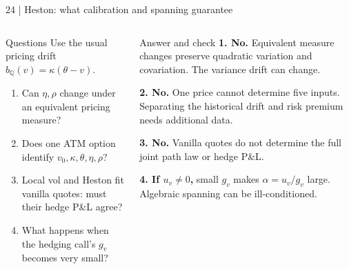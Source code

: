 \documentclass[handout,10pt,t,aspectratio=169]{beamer}
\newcommand{\Q}{\mathbb Q}
\newenvironment{questions}{\begin{block}{Questions}}{\end{block}}
\newenvironment{answers}{\begin{exampleblock}{Answer and check}}{\end{exampleblock}}
\newcommand{\compact}{\small%
 \setlength{\abovedisplayskip}{3pt}%
 \setlength{\belowdisplayskip}{3pt}%
 \setlength{\abovedisplayshortskip}{2pt}%
 \setlength{\belowdisplayshortskip}{2pt}%
 \setlength{\parskip}{2pt}}
\begin{document}
\begin{frame}{24 | Heston: what calibration and spanning guarantee}
\compact
\begin{columns}[T,onlytextwidth]
\begin{questions}
Use the usual pricing drift \(b_\Q(v)=\kappa(\theta-v)\).
\begin{enumerate}
\item Can \(\eta,\rho\) change under an equivalent pricing measure?
\item Does one ATM option identify \(v_0,\kappa,\theta,\eta,\rho\)?
\item Local vol and Heston fit vanilla quotes: must their hedge P\&L agree?
\item What happens when the hedging call's \(g_v\) becomes very small?
\end{enumerate}
\end{questions}
\begin{answers}
\textbf{1. No.} Equivalent measure changes preserve quadratic variation
and covariation. The variance drift can change.

\textbf{2. No.} One price cannot determine five inputs. Separating the
historical drift and risk premium needs additional data.

\textbf{3. No.} Vanilla quotes do not determine the full joint path law
or hedge P\&L.

\textbf{4. If \(u_v\ne0\),} small \(g_v\) makes
\(\alpha=u_v/g_v\) large. Algebraic spanning can be ill-conditioned.
\end{answers}
\end{columns}
\end{frame}
\end{document}

